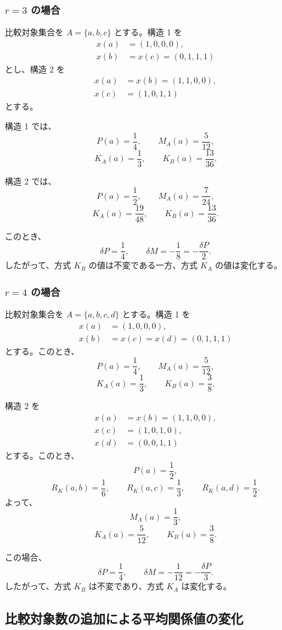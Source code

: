 \documentclass[a4paper,11pt]{ltjsarticle}
\begin{document}
\subsubsection{$r=3$ の場合}

比較対象集合を $A=\{a,b,c\}$ とする。構造 1 を
\[
\begin{aligned}
x(a)&=(1,0,0,0),\\
x(b)&=x(c)=(0,1,1,1)
\end{aligned}
\]
とし、構造 2 を
\[
\begin{aligned}
x(a)&=x(b)=(1,1,0,0),\\
x(c)&=(1,0,1,1)
\end{aligned}
\]
とする。

構造 1 では、
\[
P(a)=\frac14,\qquad M_A(a)=\frac5{12},
\]
\[
K_A(a)=\frac13,\qquad K_B(a)=\frac{13}{36}.
\]

構造 2 では、
\[
P(a)=\frac12,\qquad M_A(a)=\frac7{24},
\]
\[
K_A(a)=\frac{19}{48},\qquad K_B(a)=\frac{13}{36}.
\]

このとき、
\[
\delta P=\frac14,\qquad
\delta M=-\frac18
=-\frac{\delta P}{2}.
\]
したがって、方式 $K_B$ の値は不変である一方、方式 $K_A$ の値は変化する。

\subsubsection{$r=4$ の場合}

比較対象集合を $A=\{a,b,c,d\}$ とする。構造 1 を
\[
\begin{aligned}
x(a)&=(1,0,0,0),\\
x(b)&=x(c)=x(d)=(0,1,1,1)
\end{aligned}
\]
とする。このとき、
\[
P(a)=\frac14,\qquad M_A(a)=\frac5{12},
\]
\[
K_A(a)=\frac13,\qquad K_B(a)=\frac38.
\]

構造 2 を
\[
\begin{aligned}
x(a)&=x(b)=(1,1,0,0),\\
x(c)&=(1,0,1,0),\\
x(d)&=(0,0,1,1)
\end{aligned}
\]
とする。このとき、
\[
P(a)=\frac12,
\]
\[
R_K(a,b)=\frac16,\qquad
R_K(a,c)=\frac13,\qquad
R_K(a,d)=\frac12.
\]
よって、
\[
M_A(a)=\frac13,
\]
\[
K_A(a)=\frac5{12},\qquad K_B(a)=\frac38.
\]

この場合、
\[
\delta P=\frac14,\qquad
\delta M=-\frac1{12}
=-\frac{\delta P}{3}.
\]
したがって、方式 $K_B$ は不変であり、方式 $K_A$ は変化する。

\subsection{比較対象数の追加による平均関係値の変化}
\end{document}
